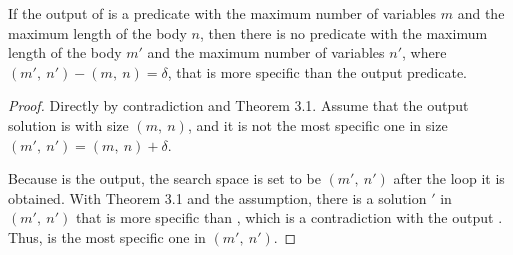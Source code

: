 \begin{theorem}
\label{thm:completeness}
If the output of \tool is a predicate with the maximum number of
variables $m$ and the maximum length of the body $n$, then there is no
predicate with the maximum length of the body $m'$ and the maximum
number of variables $n'$, where $(m',~n')-(m,~n) = \delta$, that is
more specific than the output predicate.
\end{theorem}
\begin{proof}[Proof]
  Directly by contradiction and Theorem 3.1. Assume that the output solution  is with size $(m,~n)$, and it is not the most specific one in size $(m',~n') = (m,~n) + \delta$.

 Because  is the output, the search space is set to be $(m',~n')$ after the loop it is obtained. With Theorem 3.1 and the assumption, there is a solution $'$ in $(m',~n')$ that is more specific than , which is a contradiction with the output . Thus,  is the most specific one in $(m',~n')$.
\end{proof}








